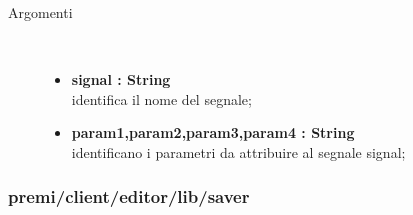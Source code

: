 \begin{description}
\begin{description}
		\begin{description}
			\item[Argomenti] \hfill \\
				\begin{itemize}
				
					\item \textbf{signal : String			} \hfill \\
					identifica il nome del segnale;
					\item \textbf{param1,param2,param3,param4 : String			} \hfill \\
					identificano i parametri da attribuire al segnale signal;			
				\end{itemize}
		\end{description}
	\end{description}		
	
	
\end{description}

\subsubsection{premi/client/editor/lib/saver}
 
